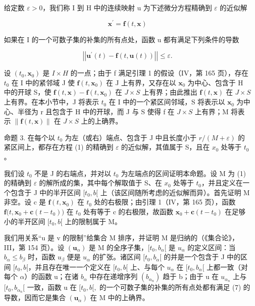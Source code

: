 给定数 \(\varepsilon > 0\)，我们称 I 到 H 中的连续映射 u 为下述微分方程精确到 \(\varepsilon\) 的近似解

\[
\mathbf {x} ^ {\prime} = \mathbf {f} (t, \mathbf {x})\tag{1}
\]

如果在 I 的一个可数子集的补集的所有点处，函数 u 都有满足下列条件的导数

\[
\left| \left| \mathbf {u} ^ {\prime} (t) - \mathbf {f} (t, \mathbf {u} (t)) \right| \right| \leqslant \varepsilon .\tag{7}
\]

设 \((t_{0}, \mathbf{x}_{0})\) 是 \(I \times H\) 的一点；由于 f 满足引理 1 的假设（IV，第 165 页），存在 \(t_{0}\) 在 I 中的紧邻域 J 使 \(\mathbf{f}(t, \mathbf{x}_{0})\) 在 J 上有界，又存在以 \(\mathbf{x}_{0}\) 为中心、包含于 H 中的开球 S，使 \(\mathbf{f}(t, \mathbf{x}) - \mathbf{f}(t, \mathbf{x}_{0})\) 在 \(J \times S\) 上有界；由此推出 \(\mathbf{f}(t, \mathbf{x})\) 在 \(J \times S\) 上有界。在本小节中，J 将表示 \(t_{0}\) 在 I 中的一个紧区间邻域，S 将表示以 \(\mathbf{x}_{0}\) 为中心、半径为 r 且包含于 H 中的开球，而 J 与 S 使得 f 在 \(J \times S\) 上有界；M 将表示 \(\| \mathbf{f}(t, \mathbf{x}) \|\) 在 \(J \times S\) 上的上确界。

命题 3. 在每个以 \(t_{0}\) 为左（或右）端点、包含于 J 中且长度小于 \(r/(M + \varepsilon)\) 的紧区间上，都存在方程 (1) 的精确到 \(\varepsilon\) 的近似解，其值属于 S，且在 \(x_{0}\) 处等于 \(t_{0}\)。

我们设 \(t_{0}\) 不是 J 的右端点，并对以 \(t_{0}\) 为左端点的区间证明本命题。设 M 为 (1) 的精确到 \(\varepsilon\) 的解所成的集，其中每个解取值于 S、在 \(x_{0}\) 处等于 \(t_{0}\)，并且定义在一个包含于 J 中的半开区间 \([t_{0}, b[\) 上（该区间随所考虑的近似解而异）。首先证明 M 非空。设 c 是 \(\mathbf{f}(t, \mathbf{x}_{0})\) 在 \(t_{0}\) 处的右极限；由引理 1（IV，第 165 页），函数 \(\mathbf{f}\big(t, \mathbf{x}_{0} + \mathbf{c}(t - t_{0})\big)\) 在 \(t_{0}\) 处有等于 c 的右极限，故函数 \(\mathbf{x}_{0} + \mathbf{c}(t - t_{0})\) 在足够小的半开区间 \([t_{0}, b[\) 上的限制属于 M。

我们用关系“u 是 v 的限制”给集合 M 排序，并证明 M 是归纳的（《集合论》，III，第 154 页）。设 \((\mathbf{u}_{\alpha})\) 是 M 的全序子集，\([t_{0}, b_{\alpha}[\) 是 \(u_{\alpha}\) 的定义区间：当 \(b_{\alpha} \leqslant b_{\beta}\) 时，函数 \(u_{\beta}\) 便是 \(u_{\alpha}\) 的扩张。诸区间 \([t_{0}, b_{\alpha}[\) 的并是一个包含于 J 中的区间 \([t_{0}, b[\)，并且存在唯一一个定义在 \([t_{0}, b[\) 上、与每个 \(u_{\alpha}\) 在 \([t_{0}, b_{\alpha}[\) 上都一致（对每个 \(\alpha\)）的函数 u；在诸 \(b_{\alpha}\) 中存在递增序列 \((b_{\alpha_{n}})\) 趋于 b；由于 u 在 \(u_{\alpha_{n}}\) 上与 \([t_{0}, b_{\alpha_{n}}[\) 一致，函数 u 在 \([t_{0}, b[,\) 的一个可数子集的补集的所有点处都有满足 (7) 的导数，因而它是集合 \((\mathbf{u}_{\alpha})\) 在 M 中的上确界。

